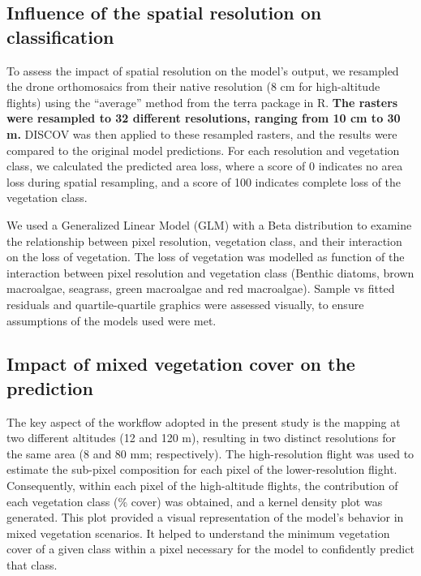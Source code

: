 \documentclass[
  number]{elsarticle}
\begin{document}
\subsection{Influence of the spatial resolution on
classification}\label{influence-of-the-spatial-resolution-on-classification}

To assess the impact of spatial resolution on the model's output, we
resampled the drone orthomosaics from their native resolution (8 cm for
high-altitude flights) using the ``average'' method from the terra
package in R. \textbf{The rasters were resampled to 32 different
resolutions, ranging from 10 cm to 30 m.} DISCOV was then applied to
these resampled rasters, and the results were compared to the original
model predictions. For each resolution and vegetation class, we
calculated the predicted area loss, where a score of 0 indicates no area
loss during spatial resampling, and a score of 100 indicates complete
loss of the vegetation class.

We used a Generalized Linear Model (GLM) with a Beta distribution to
examine the relationship between pixel resolution, vegetation class, and
their interaction on the loss of vegetation. The loss of vegetation was
modelled as function of the interaction between pixel resolution and
vegetation class (Benthic diatoms, brown macroalgae, seagrass, green
macroalgae and red macroalgae). Sample vs fitted residuals and
quartile-quartile graphics were assessed visually, to ensure assumptions
of the models used were met.

\subsection{Impact of mixed vegetation cover on the
prediction}\label{impact-of-mixed-vegetation-cover-on-the-prediction}

The key aspect of the workflow adopted in the present study is the
mapping at two different altitudes (12 and 120 m), resulting in two
distinct resolutions for the same area (8 and 80 mm; respectively). The
high-resolution flight was used to estimate the sub-pixel composition
for each pixel of the lower-resolution flight. Consequently, within each
pixel of the high-altitude flights, the contribution of each vegetation
class (\% cover) was obtained, and a kernel density plot was generated.
This plot provided a visual representation of the model's behavior in
mixed vegetation scenarios. It helped to understand the minimum
vegetation cover of a given class within a pixel necessary for the model
to confidently predict that class.
\end{document}
